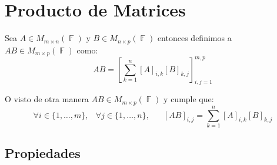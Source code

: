 \documentclass[12pt, fleqn]{report}                             %
\DeclareMathOperator \Space {\quad}                             %
\DeclareMathOperator \MiniSpace {\;}                            %
\theoremstyle{break}                                            %
\DeclareMathOperator \GenericField {\mathbb{F}}                 %
\newcommand{\Brackets}[1]{\left[ #1 \right]}                    %
\begin{document}
        \clearpage
        \section{Producto de Matrices}

            Sea $A \in M_{m \times n}(\GenericField)$ y $B \in M_{n \times p}(\GenericField)$
            entonces definimos a $AB \in M_{m \times p}(\GenericField)$ como:
            \begin{equation*}
                AB = \Brackets{ \sum_{k = 1}^n [A]_{i, k} [B]_{k, j} }_{i, j = 1}^{m, p}
            \end{equation*}

            O visto de otra manera $AB \in M_{m \times p}(\GenericField)$ y cumple que:
            \begin{equation*}
                \forall i \in \{1, \dots, m\} ,\MiniSpace
                    \forall j \in \{1, \dots, n\} ,\Space
                        [AB]_{i, j} = \sum_{k = 1}^n [A]_{i, k} [B]_{k, j}
            \end{equation*}


            \vspace{2em}
            \subsection{Propiedades}
\end{document}
